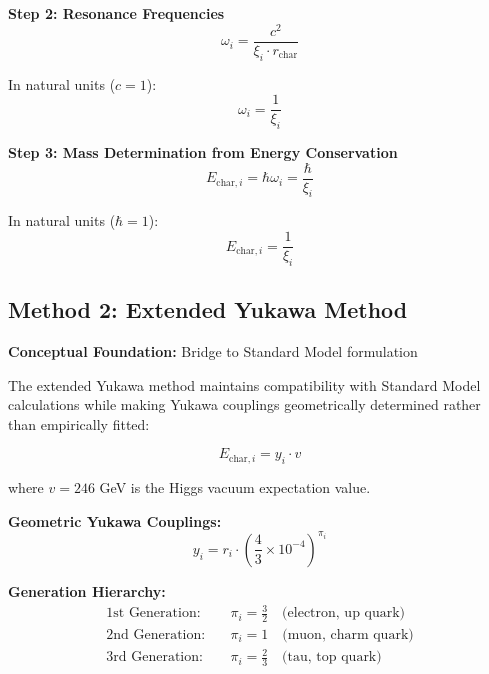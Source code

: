 	\textbf{Step 2: Resonance Frequencies}
	\begin{equation}
		\omega_i = \frac{c^2}{\xi_i \cdot r_{\text{char}}}
		\label{eq:resonance_frequencies}
	\end{equation}
	
	In natural units ($c = 1$):
	\begin{equation}
		\omega_i = \frac{1}{\xi_i}
	\end{equation}
	
	\textbf{Step 3: Mass Determination from Energy Conservation}
	\begin{equation}
		E_{\text{char},i} = \hbar \omega_i = \frac{\hbar}{\xi_i}
		\label{eq:energy_from_frequency}
	\end{equation}
	
	In natural units ($\hbar = 1$):
	\begin{equation}
		\boxed{E_{\text{char},i} = \frac{1}{\xi_i}}
		\label{eq:characteristic_energy_direct}
	\end{equation}
	
	\subsection{Method 2: Extended Yukawa Method}
	\label{subsec:extended_yukawa_method}
	
	\textbf{Conceptual Foundation:} Bridge to Standard Model formulation
	
	The extended Yukawa method maintains compatibility with Standard Model calculations while making Yukawa couplings geometrically determined rather than empirically fitted:
	
	\begin{equation}
		E_{\text{char},i} = y_i \cdot v
		\label{eq:yukawa_mass_formula}
	\end{equation}
	
	where $v = 246$ GeV is the Higgs vacuum expectation value.
	
	\textbf{Geometric Yukawa Couplings:}
	\begin{equation}
		\boxed{y_i = r_i \cdot \left(\frac{4}{3} \times 10^{-4}\right)^{\pi_i}}
		\label{eq:geometric_yukawa}
	\end{equation}
	
	\textbf{Generation Hierarchy:}
	\begin{align}
		\text{1st Generation:} \quad &\pi_i = \frac{3}{2} \quad \text{(electron, up quark)} \\
		\text{2nd Generation:} \quad &\pi_i = 1 \quad \text{(muon, charm quark)} \\
		\text{3rd Generation:} \quad &\pi_i = \frac{2}{3} \quad \text{(tau, top quark)}
	\end{align}
	
